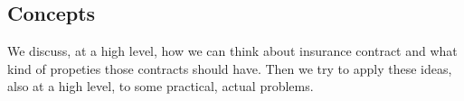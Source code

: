 
\begin{partbacktext}
\part{Concepts}
\noindent We discuss, at a high level, how we can think about insurance contract and what kind of propeties those contracts
should have. Then we try to apply these ideas, also at a high level, to some practical, actual problems.

\end{partbacktext}

